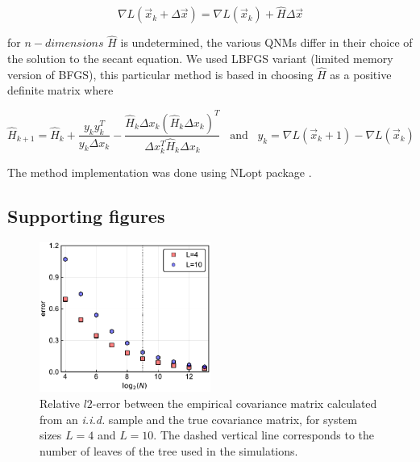 \documentclass[preprint,amsmath,amssymb,superscriptaddress,showpacs,pre]{revtex4-1}
\begin{document}
$$\nabla L(\vec{x}_k+\Delta\vec{x})=\nabla L(\vec{x}_k)+\hat{H} \Delta\vec{x} $$


for $n-dimensions$ $\hat{H}$ is undetermined, the various QNMs differ in their choice of the solution to the secant equation. We used LBFGS variant  (limited memory version of BFGS), this particular method is based in choosing $\hat{H}$ as a positive definite matrix where

$$\hat{H}_{k+1}=\hat{H}_{k}+\frac{y_k y^{T}_k}{y_k\Delta x_k} - \frac{\hat{H}_k\Delta x_k(\hat{H}_k\Delta x_k)^T}{\Delta x^T_k\hat{H}_k\Delta x_k} \;\;\;\text{and}\;\;\; y_k=\nabla L(\vec{x}_k+1)-\nabla L(\vec{x}_k)$$

The method implementation was done using   NLopt package \cite{NLopt} .
 
\subsection{Supporting figures}
\label{sub:supplementary_figures}

\begin{figure}[!htb]
	\centering
	\includegraphics[keepaspectratio=true,width=0.5\textwidth]{Figures/error_Ciid_vs_numb_of_seq.pdf}
	\caption{Relative $l2$-error between the empirical covariance matrix calculated from an \emph{i.i.d.} sample and the true covariance matrix, for system sizes $L=4$ and $L=10$. The dashed vertical line corresponds to the number of leaves of the tree used in the simulations.}
	\label{fig:error_vs_nseqs}
\end{figure}
\end{document}
